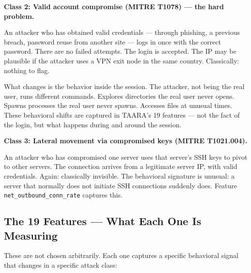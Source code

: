 \documentclass[11pt,a4paper]{article}
\begin{document}
\textbf{Class 2: Valid account compromise (MITRE T1078) — the hard problem.}

An attacker who has obtained valid credentials — through phishing, a previous breach, password reuse from another site — logs in once with the correct password. There are no failed attempts. The login is accepted. The IP may be plausible if the attacker uses a VPN exit node in the same country. Classically: nothing to flag.

What changes is the behavior inside the session. The attacker, not being the real user, runs different commands. Explores directories the real user never opens. Spawns processes the real user never spawns. Accesses files at unusual times. These behavioral shifts are captured in TAARA's 19 features — not the fact of the login, but what happens during and around the session.

\textbf{Class 3: Lateral movement via compromised keys (MITRE T1021.004).}

An attacker who has compromised one server uses that server's SSH keys to pivot to other servers. The connection arrives from a legitimate server IP, with valid credentials. Again: classically invisible. The behavioral signature is unusual: a server that normally does not initiate SSH connections suddenly does. Feature \texttt{net\_outbound\_conn\_rate} captures this.

\subsection{The 19 Features — What Each One Is Measuring}

These are not chosen arbitrarily. Each one captures a specific behavioral signal that changes in a specific attack class:
\end{document}

